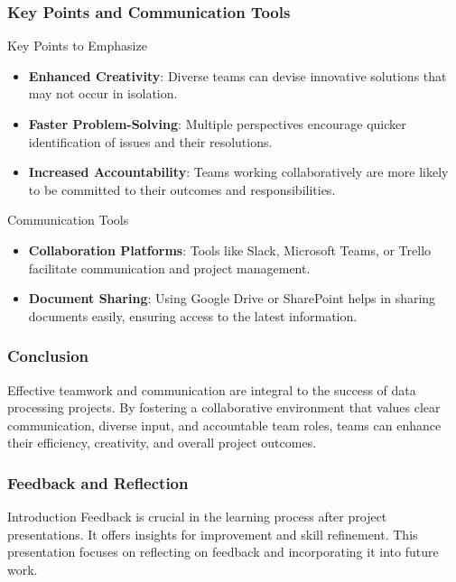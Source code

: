 \documentclass{beamer}
\begin{document}
\begin{frame}[fragile]
    \frametitle{Key Points and Communication Tools}
    \begin{block}{Key Points to Emphasize}
        \begin{itemize}
            \item \textbf{Enhanced Creativity}: Diverse teams can devise innovative solutions that may not occur in isolation.
            \item \textbf{Faster Problem-Solving}: Multiple perspectives encourage quicker identification of issues and their resolutions.
            \item \textbf{Increased Accountability}: Teams working collaboratively are more likely to be committed to their outcomes and responsibilities.
        \end{itemize}
    \end{block}

    \begin{block}{Communication Tools}
        \begin{itemize}
            \item \textbf{Collaboration Platforms}: Tools like Slack, Microsoft Teams, or Trello facilitate communication and project management.
            \item \textbf{Document Sharing}: Using Google Drive or SharePoint helps in sharing documents easily, ensuring access to the latest information.
        \end{itemize}
    \end{block}
\end{frame}

\begin{frame}[fragile]
    \frametitle{Conclusion}
    Effective teamwork and communication are integral to the success of data processing projects. By fostering a collaborative environment that values clear communication, diverse input, and accountable team roles, teams can enhance their efficiency, creativity, and overall project outcomes.
\end{frame}

\begin{frame}[fragile]
    \frametitle{Feedback and Reflection}
    \begin{block}{Introduction}
        Feedback is crucial in the learning process after project presentations. It offers insights for improvement and skill refinement. This presentation focuses on reflecting on feedback and incorporating it into future work.
    \end{block}
\end{frame}
\end{document}

